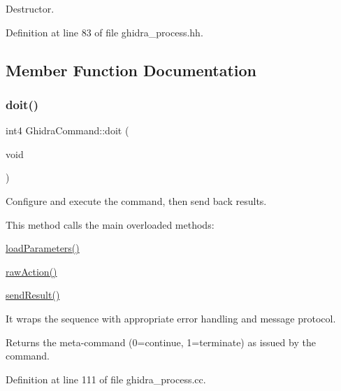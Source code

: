 Destructor. 



Definition at line 83 of file ghidra\+\_\+process.\+hh.



\subsection{Member Function Documentation}
\mbox{\label{class_ghidra_command_a60d65958413c0e4669768332fa0f0476}} 
\subsubsection{\texorpdfstring{doit()}{doit()}}
{\footnotesize\ttfamily int4 Ghidra\+Command\+::doit (\begin{DoxyParamCaption}\item[{void}]{ }\end{DoxyParamCaption})}



Configure and execute the command, then send back results. 

This method calls the main overloaded methods\+:
\begin{DoxyItemize}
\item \mbox{\hyperlink{class_ghidra_command_a3e92d63544a9e5a36f27f6c3b177b28a}{load\+Parameters()}}
\item \mbox{\hyperlink{class_ghidra_command_a7d1a5cfedfd8f1d05161d27627302716}{raw\+Action()}}
\item \mbox{\hyperlink{class_ghidra_command_a964ade9b1f768c55434d412834ba2eca}{send\+Result()}}
\end{DoxyItemize}

It wraps the sequence with appropriate error handling and message protocol. \begin{DoxyReturn}{Returns}
the meta-\/command (0=continue, 1=terminate) as issued by the command. 
\end{DoxyReturn}


Definition at line 111 of file ghidra\+\_\+process.\+cc.

